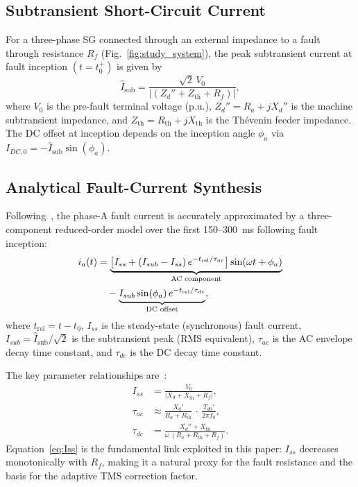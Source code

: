 \documentclass[10pt,journal,twoside]{IEEEtran}
\newcommand{\Rf}{R_{\!f}}
\begin{document}
\subsection{Subtransient Short-Circuit Current}
\label{sec:sgmodel:sub}

For a three-phase SG connected through an external impedance to a fault
through resistance $\Rf$ (Fig.~\ref{fig:study_system}), the peak subtransient
current at fault inception $(t = t_0^+)$ is given by
\begin{equation}
\hat{I}_{\mathrm{sub}} =
  \frac{\sqrt{2}\,V_0}{\bigl|(Z_d'' + Z_{\mathrm{th}} + \Rf)\bigr|},
\label{eq:Isub_exact}
\end{equation}
where $V_0$ is the pre-fault terminal voltage (p.u.),
$Z_d'' = R_a + jX_d''$ is the machine subtransient impedance, and
$Z_{\mathrm{th}} = R_{\mathrm{th}} + jX_{\mathrm{th}}$ is the Thévenin
feeder impedance.  The DC offset at inception depends on the inception angle
$\phi_a$ via $I_{DC,0} = -\hat{I}_{\mathrm{sub}}\sin(\phi_a)$.

\subsection{Analytical Fault-Current Synthesis}
\label{sec:sgmodel:synthesis}

Following~\cite{IEEE1110}, the phase-A fault current is accurately
approximated by a three-component reduced-order model over the first
150--300~ms following fault inception:
\begin{align}
i_a(t) &= \underbrace{%
  \bigl[I_{ss} + (I_{sub} - I_{ss})\,e^{-t_{\mathrm{rel}}/\tau_{ac}}\bigr]
  \sin(\omega t + \phi_a)}_{\text{AC component}}
  \nonumber\\
  &\quad
  - \underbrace{%
  I_{sub}\sin(\phi_a)\,e^{-t_{\mathrm{rel}}/\tau_{dc}}}_{\text{DC offset}},
\label{eq:ia}
\end{align}
where $t_{\mathrm{rel}} = t - t_0$, $I_{ss}$ is the steady-state
(synchronous) fault current, $I_{sub} = \hat{I}_{\mathrm{sub}}/\sqrt{2}$
is the subtransient peak (RMS equivalent), $\tau_{ac}$ is the AC envelope
decay time constant, and $\tau_{dc}$ is the DC decay time constant.

The key parameter relationships are~\cite{Kundur1994,IEEE1110}:
\begin{align}
I_{ss}    &= \frac{V_0}{|X_d + X_{\mathrm{th}} + \Rf|},
\label{eq:Iss} \\
\tau_{ac} &\approx \frac{X_d'}{R_a + R_{\mathrm{th}}}\,\cdot\,
                   \frac{T_{d0}'}{2\pi f_0},
\label{eq:tauac}\\
\tau_{dc} &= \frac{X_d'' + X_{\mathrm{th}}}{\omega\,(R_a + R_{\mathrm{th}} + \Rf)}.
\label{eq:taudc}
\end{align}
Equation~\eqref{eq:Iss} is the fundamental link exploited in this paper:
$I_{ss}$ decreases monotonically with $\Rf$, making it a natural proxy for
the fault resistance and the basis for the adaptive TMS correction factor.
\end{document}
